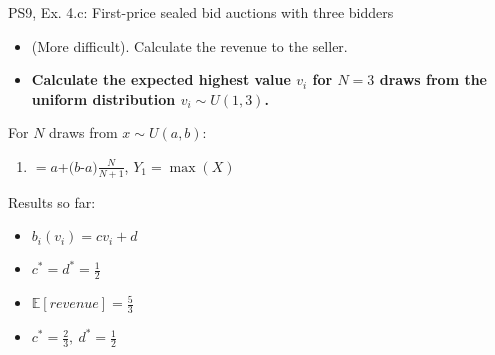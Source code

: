 \begin{frame}{PS9, Ex. 4.c: First-price sealed bid auctions with three bidders}
    \begin{itemize}
      \item[(c)] (More difficult). Calculate the revenue to the seller.
    \end{itemize}
    \vspace{-8pt}
    \begin{multicols}{2}
      \begin{itemize}
        \item[\nth{1} step:] \textbf{Calculate the expected highest value $v_i$ for $N=3$ draws from the uniform distribution $v_i\sim U(1,3)$.}
      \end{itemize}
      \vfill\null\columnbreak
      For $N$ draws from $x\sim U(a, b):$
      \vspace{-6pt}
      \begin{enumerate}
        \item[$\mathbb{E}(Y_1)$] $=a$+$(b$-$a)\frac{N}{N+1}$, $Y_1=\max(X)$
      \end{enumerate}
      \vspace{-6pt}
      Results so far:
      \vspace{-6pt}
      \begin{itemize}
        \item[($*$)] $b_i(v_i) = cv_i+d$
        \item[(3.a)] $c^*=d^*=\frac{1}{2}$
        \item[(3.b)] $\mathbb{E}[revenue]=\frac{5}{3}$
        \item[(4.a)] $c^*=\frac{2}{3},\ d^*=\frac{1}{2}$
      \end{itemize}
      \vfill\null
    \end{multicols}
    \vfill\null
\end{frame}
